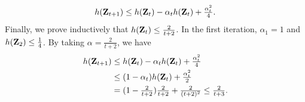\documentclass[twoside,11pt]{article}
\begin{document}
{	\begin{equation}
	h({\mathbf{Z}}_{t+1}) \leq h({\mathbf{Z}}_{t}) - \alpha_t h({\mathbf{Z}}_{t}) + \tfrac{\alpha_t^2}{4} .
	\end{equation}
	Finally, we prove inductively that $h({\mathbf{Z}}_{t}) \leq \tfrac{2}{t + 2}$. In the first iteration, $\alpha_1 = 1$ and $h({\mathbf{Z}}_{2}) \leq \tfrac{1}{4}$. By taking $\alpha = \tfrac{2}{t + 2}$, we have
	\begin{subequations}
		\begin{align}
			h({\mathbf{Z}}_{t+1})
			&\leq h({\mathbf{Z}}_{t}) - \alpha_t h({\mathbf{Z}}_{t}) + \tfrac{\alpha_t^2}{4} \\
			&\leq (1 - \alpha_t) h({\mathbf{Z}}_{t}) + \tfrac{\alpha_t^2}{2} \\
			&= (1 - \tfrac{2}{t + 2}) \tfrac{2}{t + 2} + \tfrac{2}{(t + 2)^2} \leq \tfrac{2}{t + 3} .
		\end{align}
	\end{subequations}
}
\end{document}

